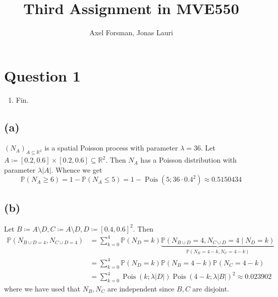 \documentclass{article}
\title{Third Assignment in MVE550}
\author{Axel Forsman, Jonas Lauri}
\DeclareMathOperator\Poisson{Pois}
\newcommand{\size}[1]{\lvert #1 \rvert}
\begin{document}

\section{Question 1}
\begin{enumerate}[label=(\alph*)]
	\item Fin.
\end{enumerate}

\subsection{(a)}
$(N_A)_{A \subseteq \mathbb R^2}$ is a spatial Poisson process
with parameter $\lambda = 36$.
Let $A \coloneqq [0.2, 0.6] \times [0.2, 0.6] \subseteq \mathbb R^2$.
Then $N_A$ has a Poisson distribution with parameter $\lambda \lvert A \rvert$.
Whence we get
$$ \mathbb P(N_A \ge 6) = 1 - \mathbb P(N_A \le 5) = 1 - \Poisson(5; 36 \cdot 0.4^2)
\approx \num{0.5150434} $$

\subsection{(b)}
\begin{center}
\end{center}

Let $B \coloneqq A \setminus D, C \coloneqq A \setminus D, D \coloneqq [0.4, 0.6]^2$.
Then
\begin{align*}
	\mathbb P(N_{B \cup D = 4}, N_{C \cup D = 4}) &= \sum_{k=0}^4 \mathbb P(N_D = k) \underbrace{\mathbb P(N_{B \cup D} = 4, N_{C \cup D} = 4 \mid N_D = k)}_{\mathbb P(N_B = 4 - k, N_C = 4 - k)} \\
												  &= \sum_{k=0}^4 \mathbb P(N_D = k) \mathbb P(N_B = 4 - k) \mathbb P(N_C = 4 - k) \\
												  &= \sum_{k=0}^4 \Poisson(k; \lambda \size{D}) \Poisson(4 - k; \lambda \size{B})^2
												  \approx \num{0.023902}
\end{align*}
where we have used that $N_B, N_C$ are independent since $B, C$ are disjoint.
\end{document}
